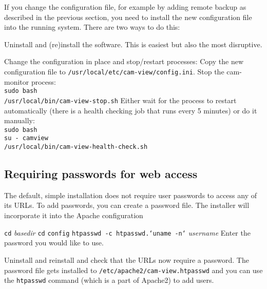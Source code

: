     If you change the configuration file, for example by adding remote backup
    as described in the previous section, you need to install the new configuration
    file into the running system.  There are two ways to do this:

    \BE
    \I Uninstall and (re)install the software.  This is easiest but also
       the most disruptive.


    \I Change the configuration in place and stop/restart processes:
       \BI
       \I Copy the new configuration file to
          \texttt{/usr/local/etc/cam-view/config.ini}.
       \I Stop the cam-monitor process:\\
          \texttt{sudo bash}\\
          \texttt{/usr/local/bin/cam-view-stop.sh}
       \I Either wait for the process to restart automatically (there
          is a health checking job that runs every 5 minutes) or do it manually:\\
          \texttt{sudo bash}\\
          \texttt{su - camview}\\
          \texttt{/usr/local/bin/cam-view-health-check.sh}
       \EI
    \EE

  \subsection{Requiring passwords for web access}

    The default, simple installation does not require user passwords
    to access any of its URLs.  To add passwords, you can create a
    password file.  The installer will incorporate it into the
    Apache configuration

    \BI
    \I \texttt{cd} \emph{basedir}
    \I \texttt{cd} \texttt{config}
    \I\label{htpasswd} \texttt{htpasswd -c htpasswd.`uname -n`} \emph{username}
    \I Enter the password you would like to use.
    \EI

    Uninstall and reinstall \PRODUCT{} and check that the
    URLs now require a password.  The password file gets
    installed to \texttt{/etc/apache2/cam-view.htpasswd}
    and you can use the \texttt{htpasswd} command (which is a part
    of Apache2) to add users.

